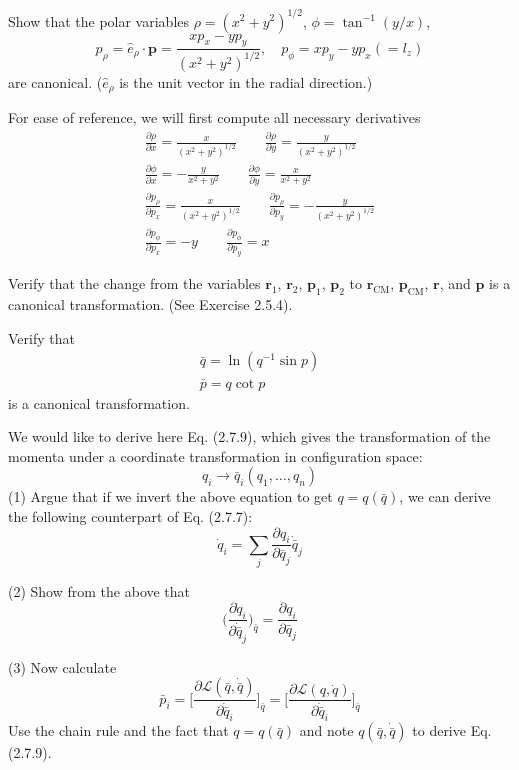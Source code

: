 \documentclass[../principles-of-quantum-mechanics.tex]{subfiles}
\begin{document}
\begin{questions}
		\question Show that the polar variables $\rho = (x^2+y^2)^{1/2}$, $\phi = \tan^{-1}(y/x)$,
		\[
			p_\rho = \hat{e}_\rho\cdot\mathbf{p} = \frac{xp_x - yp_y}{(x^2 + y^2)^{1/2}}, \quad p_\phi = xp_y - yp_x (= l_z)
		\]
		are canonical. ($\hat{e}_\rho$ is the unit vector in the radial direction.)
		
		\begin{solution}
			For ease of reference, we will first compute all necessary derivatives
			\begin{gather*}
				\frac{\partial\rho}{\partial x} = \frac{x}{(x^2 + y^2)^{1/2}} \qquad \frac{\partial\rho}{\partial y} = \frac{y}{(x^2 + y^2)^{1/2}} \\
				\frac{\partial\phi}{\partial x} = -\frac{y}{x^2 + y^2} \qquad \frac{\partial\phi}{\partial y} = \frac{x}{x^2 + y^2} \\
				\frac{\partial p_\rho}{\partial p_x} = \frac{x}{(x^2 + y^2)^{1/2}} \qquad \frac{\partial p_\rho}{\partial p_y} = -\frac{y}{(x^2 + y^2)^{1/2}} \\
				\frac{\partial p_\phi}{\partial p_x} = -y \qquad \frac{\partial p_\phi}{\partial p_y} = x
			\end{gather*}
		\end{solution}
		
		\question Verify that the change from the variables $\mathbf{r}_1$, $\mathbf{r}_2$, $\mathbf{p}_1$, $\mathbf{p}_2$ to $\mathbf{r}_{\text{CM}}$, $\mathbf{p}_{\text{CM}}$, $\mathbf{r}$, and $\mathbf{p}$ is a canonical transformation. (See Exercise 2.5.4).
		
		\question Verify that
		\begin{gather*}
			\bar{q} = \ln(q^{-1}\sin p) \\
			\bar{p} = q\cot p
		\end{gather*}
		is a canonical transformation.
		
		\question We would like to derive here Eq. (2.7.9), which gives the transformation of the momenta under a coordinate transformation in configuration space:
		\[
			q_i \to \bar{q}_i(q_1, \dots, q_n)
		\]
		(1) Argue that if we invert the above equation to get $q = q(\bar{q})$, we can derive the following counterpart of Eq. (2.7.7):
		\[
			\dot{q}_i = \sum_j\frac{\partial q_i}{\partial \bar{q}_j}\dot{\bar{q}}_j
		\]
		
		(2) Show from the above that
		\[
			\Big(\frac{\partial\dot{q}_i}{\partial\dot{\bar{q}}_j}\Big)_{\bar{q}} = \frac{\partial q_i}{\partial\bar{q}_j}
		\]
		
		(3) Now calculate
		\[
			\bar{p}_i = \Big[\frac{\partial\mathcal{L}(\bar{q}, \dot{\bar{q}})}{\partial\dot{\bar{q}}_i}\Big]_{\bar{q}} = \Big[\frac{\partial\mathcal{L}({q}, \dot{{q}})}{\partial\dot{\bar{q}}_i}\Big]_{\bar{q}}
		\]
		Use the chain rule and the fact that $q = q(\bar{q})$ and note $q(\bar{q}, \dot{\bar{q}})$ to derive Eq. (2.7.9).
		

\end{questions}
\end{document}
